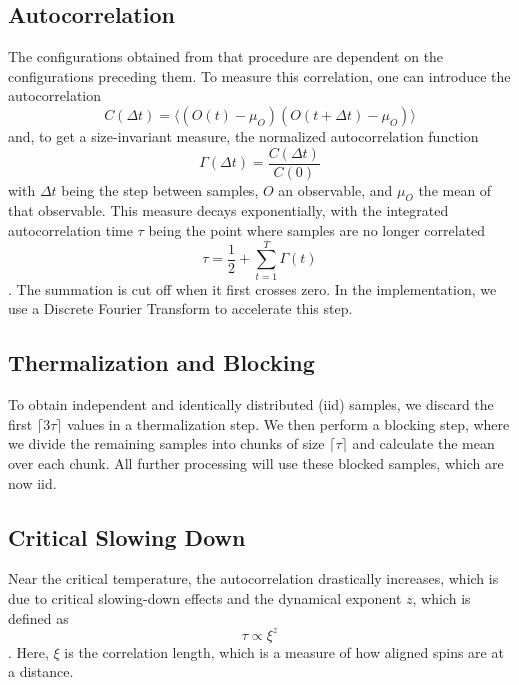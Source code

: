 	\subsection{Autocorrelation}
		The configurations obtained from that procedure are dependent on the configurations preceding them.  To measure this correlation, one can introduce the autocorrelation
		\begin{equation}
			C(\Delta t) = \langle(O(t) - \mu_O)(O(t + \Delta t) - \mu_O) \rangle
		\end{equation}
		\cite[eq. 41]{bootstrap} and, to get a size-invariant measure, the normalized autocorrelation function
		\begin{equation}
			\Gamma(\Delta t) = \frac{C(\Delta t)}{C(0)}
		\end{equation}
		\cite[eq. 43]{bootstrap} with $\Delta t$ being the step between samples, $O$ an observable, and $\mu_O$ the mean of that observable. This measure decays exponentially, with the integrated autocorrelation time $\tau$ being the point where samples are no longer correlated
		\begin{equation}
			\tau = \frac{1}{2} + \sum^{T}_{t=1}{\Gamma(t)}
		\end{equation}
		\cite[eq. 46]{bootstrap}. The summation is cut off when it first crosses zero. In the implementation, we use a Discrete Fourier Transform to accelerate this step.
		
	\subsection{Thermalization and Blocking}\label{sec:blocking}
		To obtain independent and identically distributed (iid) samples, we discard the first $\lceil 3\tau \rceil$ values in a thermalization step. We then perform a blocking step, where we divide the remaining samples into chunks of size $\lceil \tau \rceil$ and calculate the mean over each chunk. All further processing will use these blocked samples, which are now iid.
		
	\subsection{Critical Slowing Down}\label{sec:theo:critical_slowing_down}
		Near the critical temperature, the autocorrelation drastically increases, which is due to critical slowing-down effects and the dynamical exponent $z$, which is defined as
		\begin{equation}
			\tau \propto \xi^z
		\end{equation}
		\cite[eq. (6)]{bootstrap}. Here, $\xi$ is the correlation length, which is a measure of how aligned spins are at a distance.
		
